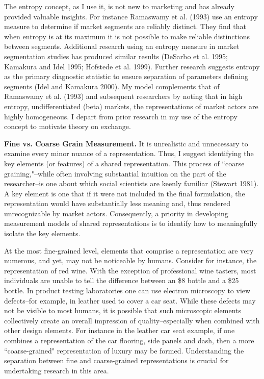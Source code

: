 The entropy concept, as I use it, is not new to marketing and has already provided valuable insights. For instance Ramaswamy et al. (1993) use an entropy measure to determine if market segments are reliably distinct. They find that when entropy is at its maximum it is not possible to make reliable distinctions between segments. Additional research using an entropy measure in market segmentation studies has produced similar results (DeSarbo et al. 1995; Kamakura and Idel 1995; Hofstede et al. 1999). Further research suggests entropy as the primary diagnostic statistic to ensure separation of parameters defining segments (Idel and Kamakura 2000). My model complements that of Ramaswamy et al. (1993) and subsequent researchers by noting that in high entropy, undifferentiated (beta) markets, the representations of market actors are highly homogeneous. I depart from prior research in my use of the entropy concept to motivate theory on exchange.

\textbf{Fine vs. Coarse Grain Measurement. }
It is unrealistic and unnecessary to examine every minor nuance of a representation. Thus, I suggest identifying the key elements (or features) of a shared representation. This process of ``coarse graining,"--while often involving substantial intuition on the part of the researcher--is one about which social scientists are keenly familiar (Stewart 1981). A key element is one that if it were not included in the final formulation, the representation would have substantially less meaning and, thus rendered unrecognizable by market actors. Consequently, a priority in developing measurement models of shared representations is to identify how to meaningfully isolate the key elements. 

At the most fine-grained level, elements that comprise a representation are very numerous, and yet, may not be noticeable by humans. Consider for instance, the representation of red wine. With the exception of professional wine tasters, most individuals are unable to tell the difference between an \$8 bottle and a \$25 bottle. In product testing laboratories one can use electron microscopy to view defects--for example, in leather used to cover a car seat. While these defects may not be visible to most humans, it is possible that such microscopic elements collectively create an overall impression of quality--especially when combined with other design elements. For instance in the leather car seat example, if one combines a representation of the car flooring, side panels and dash, then a more ``coarse-grained" representation of luxury may be formed. Understanding the separation between fine and coarse-grained representations is crucial for undertaking research in this area.

